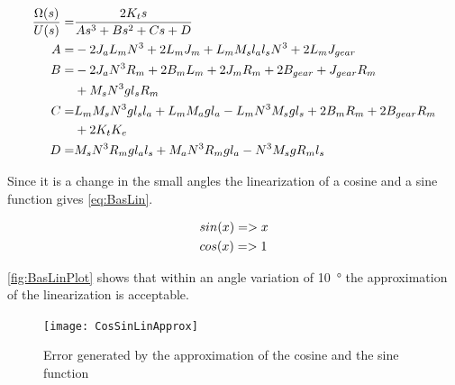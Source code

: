 \begin{subequations}\label{eq:TfMotor}
	\begin{align}
		\frac{\Omega(s)}{U(s)}=&\frac{2 K_t s}{A s^3+B s^2+C s+ D} \addunit{1}\\
		A=& -2 J_a L_m N^3+2 L_m J_m+L_m M_s l_a l_s N^3+2 L_m J_{gear}\\
		B=&-2 J_a N^3 R_m+2 B_m L_m+2 J_m R_m +2 B_{gear} + J_{gear} R_m \notag \\
		&+M_s N^3 g l_s R_m \\
		C=&L_m M_s N^3 g l_s l_a + L_m M_a g l_a - L_m N^3 M_s g l_s+2 B_m R_m+2 B_{gear} R_m \notag\\
		&+2 K_t K_e\\
		D=&M_s N^3 R_m g l_a l_s +M_a N^3 R_m g l_a -N^3 M_s g R_m l_s	
	\end{align}
\end{subequations}





Since it is a change in the small angles the linearization of a cosine and a sine function gives \autoref{eq:BasLin}.

\begin{subequations}\label{eq:BasLin}
	\begin{flalign}
		&sin(x)=>x \addunit{1}\\
		&cos(x)=>1 \addunit{1}
	\end{flalign}
\end{subequations}

\autoref{fig:BasLinPlot} shows that within an angle variation of \SI{10}{\degree} the approximation of the linearization is acceptable.

\begin{figure}[htbp]
	\centering
	\texttt{[image: CosSinLinApprox]}
	\caption{Error generated by the approximation of the cosine and the sine function}\label{fig:BasLinPlot}
\end{figure}

